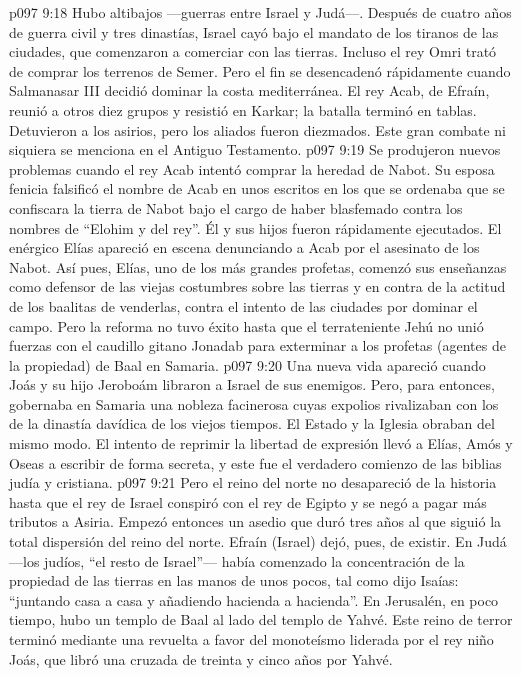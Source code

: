 \vs p097 9:18 Hubo altibajos ---guerras entre Israel y Judá---. Después de cuatro años de guerra civil y tres dinastías, Israel cayó bajo el mandato de los tiranos de las ciudades, que comenzaron a comerciar con las tierras. Incluso el rey Omri trató de comprar los terrenos de Semer. Pero el fin se desencadenó rápidamente cuando Salmanasar III decidió dominar la costa mediterránea. El rey Acab, de Efraín, reunió a otros diez grupos y resistió en Karkar; la batalla terminó en tablas. Detuvieron a los asirios, pero los aliados fueron diezmados. Este gran combate ni siquiera se menciona en el Antiguo Testamento.
\vs p097 9:19 Se produjeron nuevos problemas cuando el rey Acab intentó comprar la heredad de Nabot. Su esposa fenicia falsificó el nombre de Acab en unos escritos en los que se ordenaba que se confiscara la tierra de Nabot bajo el cargo de haber blasfemado contra los nombres de “Elohim y del rey”. Él y sus hijos fueron rápidamente ejecutados. El enérgico Elías apareció en escena denunciando a Acab por el asesinato de los Nabot. Así pues, Elías, uno de los más grandes profetas, comenzó sus enseñanzas como defensor de las viejas costumbres sobre las tierras y en contra de la actitud de los baalitas de venderlas, contra el intento de las ciudades por dominar el campo. Pero la reforma no tuvo éxito hasta que el terrateniente Jehú no unió fuerzas con el caudillo gitano Jonadab para exterminar a los profetas (agentes de la propiedad) de Baal en Samaria.
\vs p097 9:20 \pc Una nueva vida apareció cuando Joás y su hijo Jeroboám libraron a Israel de sus enemigos. Pero, para entonces, gobernaba en Samaria una nobleza facinerosa cuyas expolios rivalizaban con los de la dinastía davídica de los viejos tiempos. El Estado y la Iglesia obraban del mismo modo. El intento de reprimir la libertad de expresión llevó a Elías, Amós y Oseas a escribir de forma secreta, y este fue el verdadero comienzo de las biblias judía y cristiana.
\vs p097 9:21 \pc Pero el reino del norte no desapareció de la historia hasta que el rey de Israel conspiró con el rey de Egipto y se negó a pagar más tributos a Asiria. Empezó entonces un asedio que duró tres años al que siguió la total dispersión del reino del norte. Efraín (Israel) dejó, pues, de existir. En Judá ---los judíos, “el resto de Israel”--- había comenzado la concentración de la propiedad de las tierras en las manos de unos pocos, tal como dijo Isaías: “juntando casa a casa y añadiendo hacienda a hacienda”. En Jerusalén, en poco tiempo, hubo un templo de Baal al lado del templo de Yahvé. Este reino de terror terminó mediante una revuelta a favor del monoteísmo liderada por el rey niño Joás, que libró una cruzada de treinta y cinco años por Yahvé.
